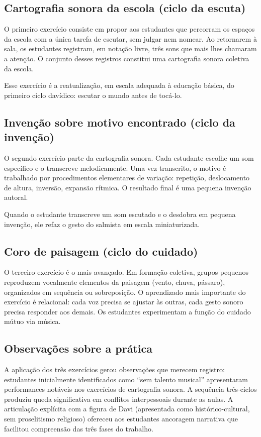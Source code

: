 \documentclass[12pt,a4paper]{article}
\begin{document}
\subsection{Cartografia sonora da escola (ciclo da escuta)}

O primeiro exercício consiste em propor aos estudantes que percorram os espaços da escola com a única tarefa de escutar, sem julgar nem nomear. Ao retornarem à sala, os estudantes registram, em notação livre, três sons que mais lhes chamaram a atenção. O conjunto desses registros constitui uma cartografia sonora coletiva da escola.

Esse exercício é a reatualização, em escala adequada à educação básica, do primeiro ciclo davídico: escutar o mundo antes de tocá-lo.

\subsection{Invenção sobre motivo encontrado (ciclo da invenção)}

O segundo exercício parte da cartografia sonora. Cada estudante escolhe um som específico e o transcreve melodicamente. Uma vez transcrito, o motivo é trabalhado por procedimentos elementares de variação: repetição, deslocamento de altura, inversão, expansão rítmica. O resultado final é uma pequena invenção autoral.

Quando o estudante transcreve um som escutado e o desdobra em pequena invenção, ele refaz o gesto do salmista em escala miniaturizada.

\subsection{Coro de paisagem (ciclo do cuidado)}

O terceiro exercício é o mais avançado. Em formação coletiva, grupos pequenos reproduzem vocalmente elementos da paisagem (vento, chuva, pássaro), organizados em sequência ou sobreposição. O aprendizado mais importante do exercício é relacional: cada voz precisa se ajustar às outras, cada gesto sonoro precisa responder aos demais. Os estudantes experimentam a função do cuidado mútuo via música.

\subsection{Observações sobre a prática}

A aplicação dos três exercícios gerou observações que merecem registro: estudantes inicialmente identificados como ``sem talento musical'' apresentaram performances notáveis nos exercícios de cartografia sonora. A sequência três-ciclos produziu queda significativa em conflitos interpessoais durante as aulas. A articulação explícita com a figura de Davi (apresentada como histórico-cultural, sem proselitismo religioso) ofereceu aos estudantes ancoragem narrativa que facilitou compreensão das três fases do trabalho.
\end{document}
